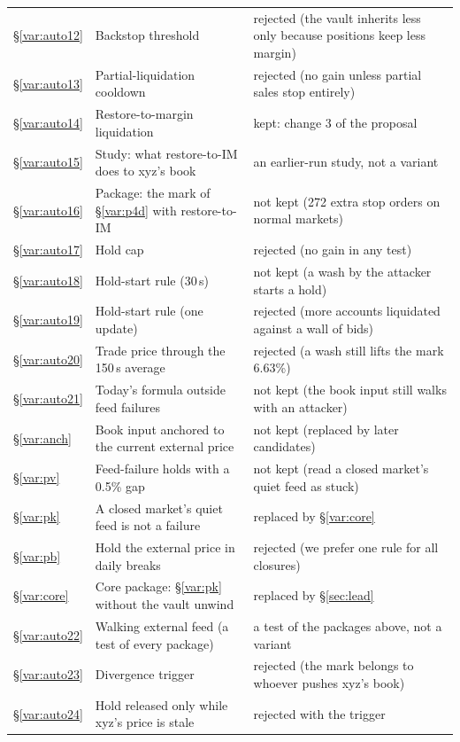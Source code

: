 \documentclass[10.5pt,a4paper]{article}
\begin{document}
{\begin{xltabular}{\textwidth}{@{}l>{\raggedright\arraybackslash}X>{\raggedright\arraybackslash}p{5.2cm}@{}}
\S\ref{var:auto12} & Backstop threshold & rejected (the vault inherits less only because positions keep less margin)\\
\S\ref{var:auto13} & Partial-liquidation cooldown & rejected (no gain unless partial sales stop entirely)\\
\S\ref{var:auto14} & Restore-to-margin liquidation & kept: change 3 of the proposal\\
\S\ref{var:auto15} & Study: what restore-to-IM does to xyz's book & an earlier-run study, not a variant\\
\S\ref{var:auto16} & Package: the mark of \S\ref{var:p4d} with restore-to-IM & not kept (272 extra stop orders on normal markets)\\
\S\ref{var:auto17} & Hold cap & rejected (no gain in any test)\\
\S\ref{var:auto18} & Hold-start rule (30\,s) & not kept (a wash by the attacker starts a hold)\\
\S\ref{var:auto19} & Hold-start rule (one update) & rejected (more accounts liquidated against a wall of bids)\\
\S\ref{var:auto20} & Trade price through the 150\,s average & rejected (a wash still lifts the mark 6.63\%)\\
\S\ref{var:auto21} & Today's formula outside feed failures & not kept (the book input still walks with an attacker)\\
\S\ref{var:anch} & Book input anchored to the current external price & not kept (replaced by later candidates)\\
\S\ref{var:pv} & Feed-failure holds with a 0.5\% gap & not kept (read a closed market's quiet feed as stuck)\\
\S\ref{var:pk} & A closed market's quiet feed is not a failure & replaced by \S\ref{var:core}\\
\S\ref{var:pb} & Hold the external price in daily breaks & rejected (we prefer one rule for all closures)\\
\S\ref{var:core} & Core package: \S\ref{var:pk} without the vault unwind & replaced by \S\ref{sec:lead}\\
\S\ref{var:auto22} & Walking external feed (a test of every package) & a test of the packages above, not a variant\\
\S\ref{var:auto23} & Divergence trigger & rejected (the mark belongs to whoever pushes xyz's book)\\
\S\ref{var:auto24} & Hold released only while xyz's price is stale & rejected with the trigger\\

\end{xltabular}}
\end{document}
